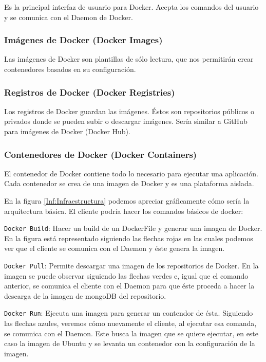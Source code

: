 Es la principal interfaz de usuario para Docker. Acepta los comandos del usuario y se
comunica con el Daemon de Docker.

\subsubsection{Imágenes de Docker (Docker Images)}

Las imágenes de Docker son plantillas de sólo lectura, que nos permitirán crear contenedores basados en su configuración.

\subsubsection{Registros de Docker (Docker Registries)}

Los registros de Docker guardan las imágenes. Éstos son repositorios públicos o privados donde se pueden subir o descargar imágenes. Sería similar a GitHub para imágenes de Docker (Docker Hub).

\subsubsection{Contenedores de Docker (Docker Containers)}

El contenedor de Docker contiene todo lo necesario para ejecutar una aplicación. Cada contenedor se crea de una imagen de Docker y es una plataforma aislada.
\newline

En la figura \ref{Inf:Infraestructura} podemos apreciar gráficamente cómo sería la arquitectura básica. El cliente podría hacer los comandos básicos de docker:

\texttt{Docker Build}: Hacer un build de un DockerFile y generar una imagen de Docker. En la figura está representado siguiendo las flechas rojas en las cuales podemos ver que el cliente se comunica con el Daemon y éste genera la imagen.

\texttt{Docker Pull}: Permite descargar una imagen de los repositorios de Docker. En la imagen se puede observar siguiendo las flechas verdes e, igual que el comando anterior, se comunica el cliente con el Daemon para que éste proceda a hacer la descarga de la imagen de mongoDB del repositorio. 

\texttt{Docker Run}: Ejecuta una imagen para generar un contendor de ésta. Siguiendo las flechas azules, veremos cómo nuevamente el cliente, al ejecutar esa comanda, se comunica con el Daemon. Este busca la imagen que se quiere ejecutar, en este caso la imagen de Ubuntu y se levanta un contenedor con la configuración de la imagen.

